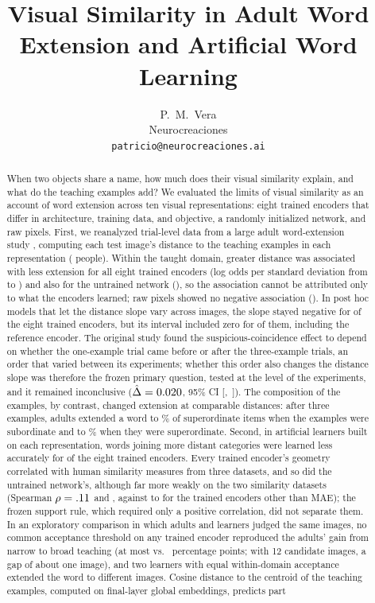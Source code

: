 \documentclass[11pt]{article}
\title{Visual Similarity in Adult Word Extension and Artificial Word Learning}
\author{
P.~M.~Vera\\
Neurocreaciones\\
\texttt{patricio@neurocreaciones.ai}
}
\date{}
\begin{document}
\maketitle
\vspace{-1.0em}

\begin{abstract}
When two objects share a name, how much does their visual similarity explain, and what do the teaching examples add? We evaluated the limits of visual similarity as an account of word extension across ten visual representations: eight trained encoders that differ in architecture, training data, and objective, a randomly initialized network, and raw pixels. First, we reanalyzed trial-level data from a large adult word-extension study \parencite{lewis2018}, computing each test image's distance to the teaching examples in each representation (\VtPersons{} people). Within the taught domain, greater distance was associated with less extension for all eight trained encoders (log odds per standard deviation from \VtPcViTB{} to \VtPcMaeB) and also for the untrained network (\VtPcRandB), so the association cannot be attributed only to what the encoders learned; raw pixels showed no negative association (\VtPcPixB). In post hoc models that let the distance slope vary across images, the slope stayed negative for \VcImgTrSameSignWord{} of the eight trained encoders, but its interval included zero for \VcImgTrInclWord{} of them, including the reference encoder. The original study found the suspicious-coincidence effect to depend on whether the one-example trial came before or after the three-example trials, an order that varied between its experiments; whether this order also changes the distance slope was therefore the frozen primary question, tested at the level of the experiments, and it remained inconclusive ($\hat\Delta = 0.020$, 95\% CI [\VtOrdLo,~\VtOrdHi]). The composition of the examples, by contrast, changed extension at comparable distances: after three examples, adults extended a word to \SelSubSup\% of superordinate items when the examples were subordinate and to \SelSupSup\% when they were superordinate. Second, in artificial learners built on each representation, words joining more distant categories were learned less accurately for \VtDSupportWord{} of the eight trained encoders. Every trained encoder's geometry correlated with human similarity measures from three datasets, and so did the untrained network's, although far more weakly on the two similarity datasets (Spearman $\rho = .11$ and \VtHoneRandHsj, against \VcHoneTrMin{} to \VcHoneTrMax{} for the trained encoders other than MAE); the frozen support rule, which required only a positive correlation, did not separate them. In an exploratory comparison in which adults and learners judged the same images, no common acceptance threshold on any trained encoder reproduced the adults' gain from narrow to broad teaching (at most \VtXJumpMax{} vs.\ \VtXJumpAdult{} percentage points; with 12 candidate images, a gap of about one image), and two learners with equal within-domain acceptance extended the word to different images. Cosine distance to the centroid of the teaching examples, computed on final-layer global embeddings, predicts part 
\end{abstract}
\end{document}

